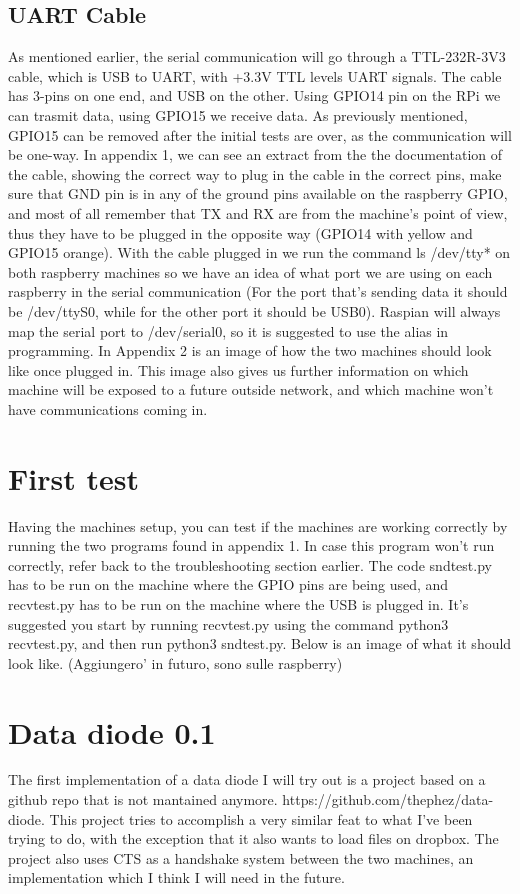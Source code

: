 \documentclass[a4paper,11pt]{scrartcl}
\begin{document}
\subsection{UART Cable}
As mentioned earlier, the serial communication will go through a TTL-232R-3V3 cable, which is USB to UART, with +3.3V TTL levels UART signals. The cable has 3-pins on one end, and USB on the other. Using GPIO14 pin on the RPi we can trasmit data, using GPIO15 we receive data.
As previously mentioned, GPIO15 can be removed after the initial tests are over, as the communication will be one-way. In appendix 1, we can see an extract from the the documentation of the cable, showing the correct way to plug in the cable in the correct pins, make sure that GND pin is in any of the ground pins available on the raspberry GPIO, and most of all remember that TX and RX are from the machine's point of view, thus they have to be plugged in the opposite way (GPIO14 with yellow and GPIO15 orange). With the cable plugged in we run the command ls /dev/tty* on both raspberry machines so we have an idea of what port we are using on each raspberry in the serial communication (For the port that's sending data it should be /dev/ttyS0, while for the other port it should be USB0). Raspian will always map the serial port to /dev/serial0, so it is suggested to use the alias in programming. In Appendix 2 is an image of how the two machines should look like once plugged in. This image also gives us further information on which machine will be exposed to a future outside network, and which machine won't have communications coming in.

\section{First test}
Having the machines setup, you can test if the machines are working correctly by running the two programs found in appendix 1. In case this program won't run correctly, refer back to the troubleshooting section earlier. The code sndtest.py has to be run on the machine where the GPIO pins are being used, and recvtest.py has to be run on the machine where the USB is plugged in. It's suggested you start by running recvtest.py using the command python3 recvtest.py, and then run python3 sndtest.py. Below is an image of what it should look like. (Aggiungero' in futuro, sono sulle raspberry)

\section{Data diode 0.1}
The first implementation of a data diode I will try out is a project based on a github repo that is not mantained anymore. https://github.com/thephez/data-diode. This project tries to accomplish a very similar feat to what I've been trying to do, with the exception that it also wants to load files on dropbox. The project also uses CTS as a handshake system between the two machines, an implementation which I think I will need in the future.
\end{document}
